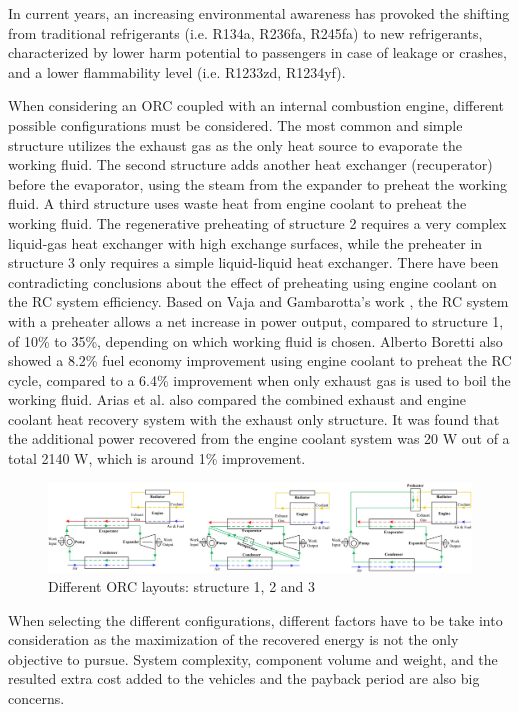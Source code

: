 In current years, an increasing environmental awareness has provoked the shifting from traditional refrigerants (i.e. R134a, R236fa, R245fa) to new refrigerants, characterized by lower harm potential to passengers in case of leakage or crashes, and a lower flammability level (i.e. R1233zd, R1234yf).

When considering an ORC coupled with an internal combustion engine, different possible configurations must be considered. The most common and simple structure utilizes the exhaust gas as the only heat source to evaporate the working fluid. The second structure adds another heat exchanger (recuperator) before the evaporator, using the steam from the expander to preheat the working fluid. A third structure uses waste heat from engine coolant to preheat the working fluid. The regenerative preheating of structure 2 requires a very complex liquid-gas heat exchanger with high exchange surfaces, while the preheater in structure 3 only requires a simple liquid-liquid heat exchanger. There have been contradicting conclusions about the effect of preheating using engine coolant on the RC system efficiency. Based on Vaja and Gambarotta's work \cite{Vaja2010}, the RC system with a preheater allows a net increase in power output, compared to structure 1, of 10\% to 35\%, depending on which working fluid is chosen. Alberto Boretti \cite{Boretti2012} also showed a 8.2\% fuel economy improvement using engine coolant to preheat the RC cycle, compared to a 6.4\% improvement when only exhaust gas is used to boil the working fluid. Arias et al. \cite{Arias2006} also compared the combined exhaust and engine coolant heat recovery system with the exhaust only structure. It was found that the additional power recovered from the engine coolant system was 20 W out of a total 2140 W, which is around 1\% improvement.

\begin{figure}[ht]
  \centering
  \includegraphics[width=\textwidth]{figures/review/orc_layouts.jpg}
  \caption{Different ORC layouts: structure 1, 2 and 3\label{fig:orc_layouts} }
\end{figure}

When selecting the different configurations, different factors have to be take into consideration as the maximization of the recovered energy is not the only objective to pursue. System complexity, component volume and weight, and the resulted extra cost added to the vehicles and the payback period are also big concerns.

